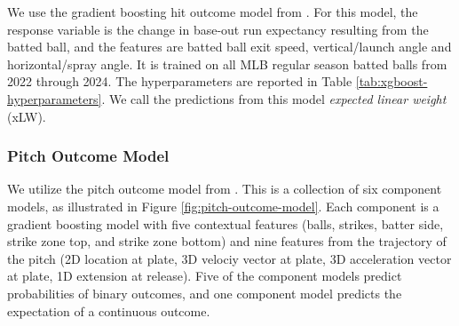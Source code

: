 \documentclass[
  12pt]{article}
\begin{document}
        We use the gradient boosting hit outcome model from \citet{powers_pitch_2023}. For this model, the response variable is the change in base-out run expectancy resulting from the batted ball, and the features are batted ball exit speed, vertical/launch angle and horizontal/spray angle. It is trained on all MLB regular season batted balls from 2022 through 2024. The hyperparameters are reported in Table \ref{tab:xgboost-hyperparameters}. We call the predictions from this model {\it expected linear weight} (xLW).

      \subsubsection{Pitch Outcome Model}
      \label{sec:pitch-outcome-model}

        We utilize the pitch outcome model from \citet{powers_pitch_2023}. This is a collection of six component models, as illustrated in Figure \ref{fig:pitch-outcome-model}. Each component is a gradient boosting model with five contextual features (balls, strikes, batter side, strike zone top, and strike zone bottom) and nine features from the trajectory of the pitch (2D location at plate, 3D velociy vector at plate, 3D acceleration vector at plate, 1D extension at release). Five of the component models predict probabilities of binary outcomes, and one component model predicts the expectation of a continuous outcome.
\end{document}
